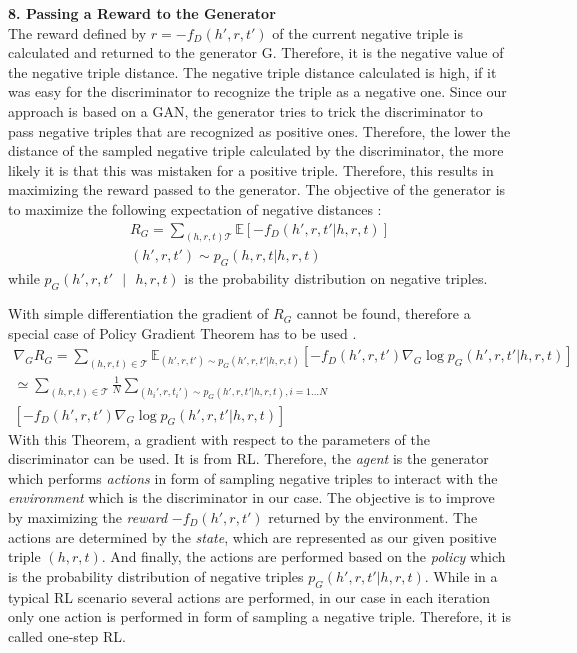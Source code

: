 \textbf{8. Passing a Reward to the Generator}\\
%
The reward defined by $r = - f_D(h',r,t')$ of the current negative triple is calculated and returned to the generator G.
Therefore, it is the negative value of the negative triple distance.
The negative triple distance calculated is high, if it was easy for the discriminator to recognize the triple as a negative one.
Since our approach is based on a \ac{GAN}, the generator tries to trick the discriminator to pass negative triples that are recognized as positive ones.
Therefore, the lower the distance of the sampled negative triple calculated by the discriminator, the more likely it is that this was mistaken for a positive triple.
Therefore, this results in maximizing the reward passed to the generator.
The objective of the generator is to maximize the following expectation of negative distances \cite{cai2017kbgan}:
\begin{multline}
    R_G = \sum_{(h,r,t) \mathcal{T}}{\mathbb{E}[-f_D(h',r,t'|h,r,t)]}\\
    (h',r,t') \sim p_G(h,r,t|h,r,t) 
\end{multline}
while $p_G(h', r, t'\text{ }|\text{ }h, r, t)$ is the probability distribution on negative triples.

With simple differentiation the gradient of $R_G$ cannot be found, therefore a special case of Policy Gradient Theorem has to be used \cite{cai2017kbgan}.
\begin{multline}
    \nabla_G R_G=\sum_{(h,r,t)\in\mathcal{T}}\mathbb{E}_{(h',r,t')\sim p_G(h',r,t'|h,r,t)}
    [-f_D(h',r,t')\nabla_G \log p_G(h',r,t'|h,r,t)] \\
    \simeq \sum_{(h,r,t)\in\mathcal{T}}\frac{1}{N}\sum_{(h_i',r,t_i')\sim p_G(h',r,t'|h,r,t), i=1\dots N} \\
    [-f_D(h',r,t')\nabla_G \log p_G(h',r,t'|h,r,t)]
\end{multline}
With this Theorem, a gradient with respect to the parameters of the discriminator can be used.
It is from \ac{RL}.
Therefore, the \textit{agent} is the generator which performs \textit{actions} in form of sampling negative triples to interact with the \textit{environment} which is the discriminator in our case.
The objective is to improve by maximizing the \textit{reward} $-f_D(h',r,t')$ returned by the environment.
The actions are determined by the \textit{state}, which are represented as our given positive triple $(h,r,t)$.
And finally, the actions are performed based on the \textit{policy} which is the probability distribution of negative triples $p_G(h',r,t'|h,r,t)$.
While in a typical \ac{RL} scenario several actions are performed, in our case in each iteration only one action is performed in form of sampling a negative triple.
Therefore, it is called one-step \ac{RL}.
